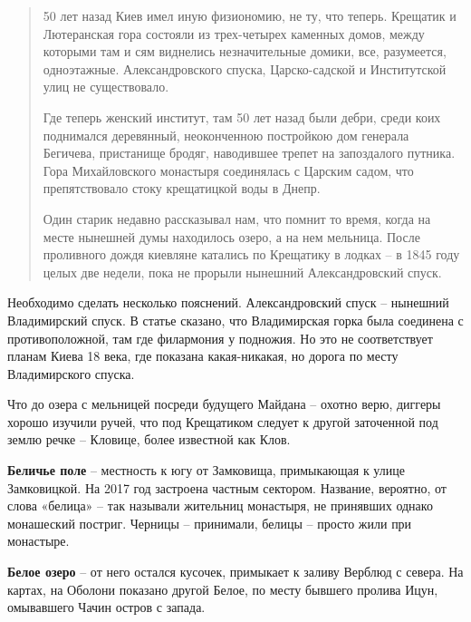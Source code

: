 \begin{quotation}
50 лет назад Киев имел иную физиономию, не ту, что теперь. Крещатик и Лютеранская гора состояли из трех-четырех каменных домов, между которыми там и сям виднелись незначительные домики, все, разумеется, одноэтажные. Александровского спуска, Царско-садской и Институтской улиц не существовало.

Где теперь женский институт, там 50 лет назад были дебри, среди коих поднимался деревянный, неоконченною постройкою дом генерала Бегичева, пристанище бродяг, наводившее трепет на запоздалого путника. Гора Михайловского монастыря соединялась с Царским садом, что препятствовало стоку крещатицкой воды в Днепр.

Один старик недавно рассказывал нам, что помнит то время, когда на месте нынешней думы находилось озеро, а на нем мельница. После проливного дождя киевляне катались по Крещатику в лодках – в 1845 году целых две недели, пока не прорыли нынешний Александровский спуск.
\end{quotation}

Необходимо сделать несколько пояснений. Александровский спуск – нынешний Владимирский спуск. В статье сказано, что Владимирская горка была соединена с противоположной, там где филармония у подножия. Но это не соответствует планам Киева 18 века, где показана какая-никакая, но дорога по месту Владимирского спуска.

Что до озера с мельницей посреди будущего Майдана – охотно верю, диггеры хорошо изучили ручей, что под Крещатиком следует к другой заточенной под землю речке – Кловице, более известной как Клов.\\

\medskip


\textbf{Беличье поле} – местность к югу от Замковища, примыкающая к улице Замковицкой. На 2017 год застроена частным сектором. Название, вероятно, от слова «белица» – так называли жительниц монастыря, не принявших однако монашеский постриг. Черницы – принимали, белицы – просто жили при монастыре.\\


\medskip






\textbf{Белое озеро} – от него остался кусочек, примыкает к заливу Верблюд с севера. На картах, на Оболони показано другой Белое, по месту бывшего пролива Ицун, омывавшего Чачин остров с запада.\\


